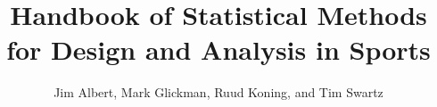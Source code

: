 \documentclass{book}
\begin{document}
\title{Handbook of Statistical Methods for Design and Analysis in Sports}
\author{Jim Albert, Mark Glickman, Ruud Koning, and Tim Swartz}

\begin{doublespace}
\maketitle 
\frontmatter
\tableofcontents
\mainmatter
{}


% 
\end{doublespace}
%
%
\end{document}
